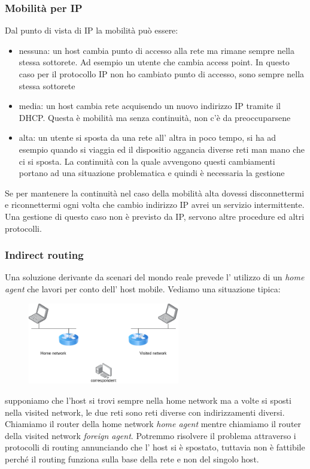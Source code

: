 \subsubsection{Mobilità per IP}
Dal punto di vista di IP la mobilità può essere:
\begin{itemize}
    \item nessuna: un host cambia punto di accesso alla rete ma rimane sempre nella stessa sottorete.
    Ad esempio un utente che cambia access point.
    In questo caso per il protocollo IP non ho cambiato punto di accesso, sono sempre nella stessa sottorete

    \item media: un host cambia rete acquisendo un nuovo indirizzo IP tramite il DHCP.
    Questa è mobilità ma senza continuità, non c'è da preoccuparsene

    \item alta: un utente si sposta da una rete all' altra in poco tempo, si ha ad esempio quando si viaggia ed il dispositio aggancia diverse reti man mano che ci si sposta.
    La continuità con la quale avvengono questi cambiamenti portano ad una situazione problematica e quindi è necessaria la gestione
\end{itemize}

Se per mantenere la continuità nel caso della mobilità alta dovessi disconnettermi e riconnettermi ogni volta che cambio indirizzo IP avrei un servizio intermittente.
Una gestione di questo caso non è previsto da IP, servono altre procedure ed altri protocolli.

\subsubsection{Indirect routing}
Una soluzione derivante da scenari del mondo reale prevede l' utilizzo di un \emph{home agent} che lavori per conto dell' host mobile.
Vediamo una situazione tipica:
\begin{figure}
    \centering
    \includegraphics[width=250px]{images/8_Wireless_Mobile/mobility.png}
\end{figure}
supponiamo che l'host si trovi sempre nella home network ma a volte si sposti nella visited network, le due reti sono reti diverse con indirizzamenti diversi.
Chiamiamo il router della home network \emph{home agent} mentre chiamiamo il router della visited network \emph{foreign agent}.
Potremmo risolvere il problema attraverso i protocolli di routing annunciando che l' host si è spostato, tuttavia non è fattibile perché il routing funziona sulla base della rete e non del singolo host.

